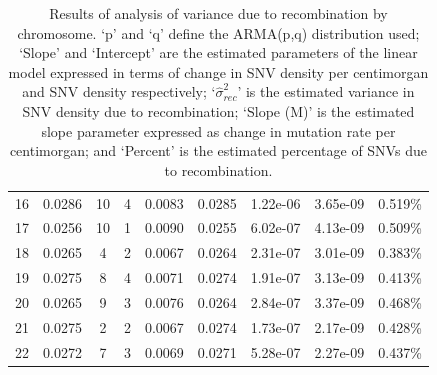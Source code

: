 \documentclass[12pt]{article}%
\begin{document}
\begin{table}[htp!]
\begin{tabular}{ c c c c c c c c c }
 16 &      0.0286 & 10 & 4 & 0.0083 &    0.0285 &                1.22e-06 &  3.65e-09 & 0.519\% \\
 17 &      0.0256 & 10 & 1 & 0.0090 &    0.0255 &                6.02e-07 &  4.13e-09 & 0.509\% \\
 18 &      0.0265 &  4 & 2 & 0.0067 &    0.0264 &                2.31e-07 &  3.01e-09 & 0.383\% \\
 19 &      0.0275 &  8 & 4 & 0.0071 &    0.0274 &                1.91e-07 &  3.13e-09 & 0.413\% \\
 20 &      0.0265 &  9 & 3 & 0.0076 &    0.0264 &                2.84e-07 &  3.37e-09 & 0.468\% \\
 21 &      0.0275 &  2 & 2 & 0.0067 &    0.0274 &                1.73e-07 &  2.17e-09 & 0.428\% \\
 22 &      0.0272 &  7 & 3 & 0.0069 &    0.0271 &                5.28e-07 &  2.27e-09 & 0.437\% \\
\hline
\end{tabular}
\caption{Results of analysis of variance due to recombination by chromosome. `p' and `q' define the ARMA(p,q) distribution used; `Slope' and `Intercept' are the estimated parameters of the linear model expressed in terms of change in SNV density per centimorgan and SNV density respectively; `$\hat{\sigma }^2_{rec}$' is the estimated variance in SNV density due to recombination; `Slope (M)' is the estimated slope parameter expressed as change in mutation rate per centimorgan; and `Percent' is the estimated percentage of SNVs due to recombination. }
\label{tab:supp-recomb}
\end{table}


\newpage
\end{document}
